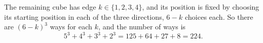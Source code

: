 The remaining cube has edge $k\in\{1,2,3,4\}$, and its position is fixed by choosing its starting position in each of the three directions, $6-k$ choices each. So there are $(6-k)^3$ ways for each $k$, and the number of ways is
\[
5^3+4^3+3^3+2^3=125+64+27+8=\boxed{224}.
\]
